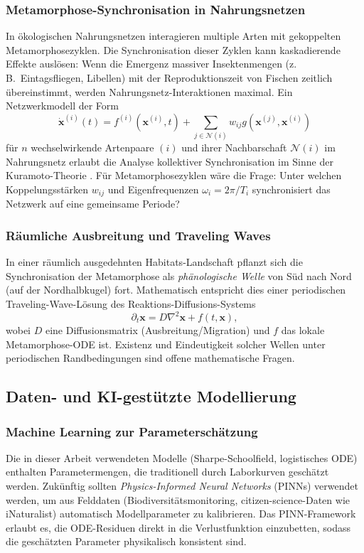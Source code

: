 ﻿\documentclass[12pt, a4paper]{article}
\theoremstyle{definition}
\begin{document}
\subsubsection{Metamorphose-Synchronisation in Nahrungsnetzen}
In ökologischen Nahrungsnetzen interagieren multiple Arten mit gekoppelten
Metamorphosezyklen. Die Synchronisation dieser Zyklen kann kaskadierende Effekte
auslösen: Wenn die Emergenz massiver Insektenmengen (z.\,B.\ Eintagsfliegen,
Libellen) mit der Reproduktionszeit von Fischen zeitlich übereinstimmt, werden
Nahrungsnetz-Interaktionen maximal. Ein Netzwerkmodell der Form
\[
  \dot{\bm{x}}^{(i)}(t) = f^{(i)}(\bm{x}^{(i)}, t) +
  \sum_{j \in \mathcal{N}(i)} w_{ij} g(\bm{x}^{(j)}, \bm{x}^{(i)})
\]
für $n$ wechselwirkende Artenpaare $(i)$ und ihrer Nachbarschaft $\mathcal{N}(i)$
im Nahrungsnetz erlaubt die Analyse kollektiver Synchronisation im Sinne der
Kuramoto-Theorie \cite{Kuramoto1984}. Für Metamorphosezyklen wäre die Frage: Unter
welchen Koppelungsstärken $w_{ij}$ und Eigenfrequenzen $\omega_i = 2\pi/T_i$
synchronisiert das Netzwerk auf eine gemeinsame Periode?

\subsubsection{Räumliche Ausbreitung und Traveling Waves}
In einer räumlich ausgedehnten Habitats-Landschaft pflanzt sich die Synchronisation
der Metamorphose als \emph{phänologische Welle} von Süd nach Nord (auf der
Nordhalbkugel) fort. Mathematisch entspricht dies einer periodischen Traveling-Wave-Lösung
des Reaktions-Diffusions-Systems
\[
  \partial_t \bm{x} = D\nabla^2 \bm{x} + f(t, \bm{x}),
\]
wobei $D$ eine Diffusionsmatrix (Ausbreitung/Migration) und $f$ das lokale
Metamorphose-ODE ist. Existenz und Eindeutigkeit solcher Wellen unter periodischen
Randbedingungen sind offene mathematische Fragen.

\subsection{Daten- und KI-gestützte Modellierung}

\subsubsection{Machine Learning zur Parameterschätzung}
Die in dieser Arbeit verwendeten Modelle (Sharpe-Schoolfield, logistisches ODE)
enthalten Parametermengen, die traditionell durch Laborkurven geschätzt werden.
Zukünftig sollten \emph{Physics-Informed Neural Networks} (PINNs) \cite{Raissi2019}
verwendet werden, um aus Felddaten (Biodiversitätsmonitoring, citizen-science-Daten
wie iNaturalist) automatisch Modellparameter zu kalibrieren. Das PINN-Framework
erlaubt es, die ODE-Residuen direkt in die Verlustfunktion einzubetten, sodass
die geschätzten Parameter physikalisch konsistent sind.
\end{document}
